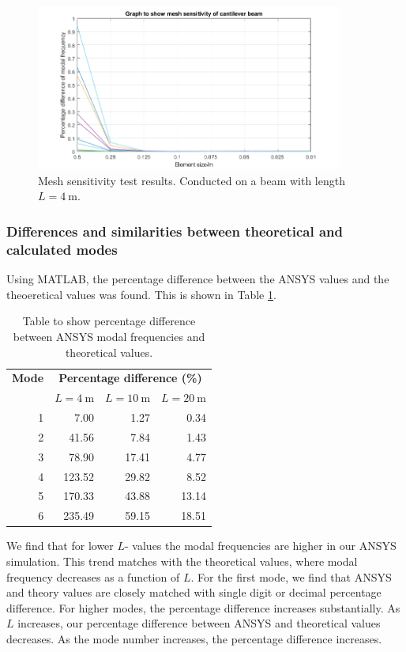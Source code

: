 \begin{figure}[H]
    \centering
    \includegraphics[width = 0.9\textwidth]{img/fig4.png}
    \caption{Mesh sensitivity test results. Conducted on a beam with length $L=\SI{4}{\meter}$.}
    \label{mesh1}
\end{figure}
\subsubsection{Differences and similarities between theoretical and calculated modes}
Using MATLAB, the percentage difference between the ANSYS values and the theoeretical values was found. This is shown in Table \ref{percDiffs}. 
\begin{table}[H]
    \centering
    \begin{tabular}{@{}rrrr@{}}
    \toprule
    \textbf{Mode} & \multicolumn{3}{c}{\textbf{Percentage difference (\%)}} \\
    & $L = \SI{4}{\meter}$ & $L = \SI{10}{\meter}$ & $L = \SI{20}{\meter}$\\
    \midrule
    1 & 7.00 & 1.27 & 0.34 \\ 
    2 & 41.56 & 7.84 & 1.43  \\
    3 & 78.90 & 17.41 & 4.77  \\
    4 & 123.52 & 29.82 & 8.52  \\
    5 & 170.33 & 43.88 & 13.14  \\
    6 & 235.49 & 59.15 & 18.51  \\ \bottomrule
    \end{tabular}
    \caption{Table to show percentage difference between ANSYS modal frequencies and theoretical values.}
    \label{percDiffs}
\end{table}
We find that for lower $L$- values the modal frequencies are higher in our ANSYS simulation. This trend matches with the theoretical values, where modal frequency decreases as a function of $L$. For the first mode, we find that ANSYS and theory values are closely matched with single digit or decimal percentage difference. For higher modes, the percentage difference increases substantially. As $L$ increases, our percentage difference between ANSYS and theoretical values decreases. As the mode number increases, the percentage difference increases. 


